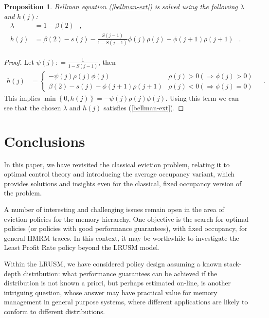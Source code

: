 \documentclass[11pt,a4paper]{article}
\DeclareMathOperator{\mf}{\enspace .}
\DeclareMathOperator{\mc}{\enspace ,}
\newcommand{\deq}{\mathrel{\mathop:}=}
\newtheorem{proposition}{Proposition}
\theoremstyle{definition}
\theoremstyle{remark}
\begin{document}
\begin{proposition}\label{m2bel}
  Bellman equation (\ref{bellman-ext}) is solved using the following $\lambda$
  and $h(j)$:
  \begin{equation}
    \begin{split}
      \lambda&=1-\beta(2) \mc\\
      h(j)&=\beta(2)-s(j)-\frac{S(j-1)}{1-S(j-1)}\phi(j)\rho(j)
      -\phi(j+1)\rho(j+1)\mf\\
                \end{split}\end{equation}
\end{proposition}
\begin{proof}  Let $\psi(j) \deq\frac{1}{1-S(j-1)}$, then
  \begin{equation}\begin{split}
      h(j)&=
      \begin{cases}
        -\psi(j)\rho(j)\phi(j)  & \rho(j)>0 \left(\Rightarrow
          \phi(j)>0\right)\\
        \beta(2)-s(j) - \phi(j+1)\rho(j+1) &\rho(j)<0
        \left(\Rightarrow \phi(j)=0\right)
      \end{cases}
    \end{split} \mf\end{equation}
  This implies $\min\left\{0, h(j)\right\}=-\psi(j)\rho(j)\phi(j)$.
    Using this term we can see that the chosen $\lambda$ and $h(j)$ satisfies
  (\ref{bellman-ext}).
\end{proof}


\section{Conclusions}
\label{sec:conclusions}

In this paper, we have revisited the classical eviction problem,
relating it to optimal control theory and introducing the average
occupancy variant, which provides solutions and insights even for the
classical, fixed occupancy version of the problem.

A number of interesting and challenging issues remain open in the area
of eviction policies for the memory hierarchy. One objective is the
search for optimal policies (or policies with good performance
guarantees), with fixed occupancy, for general HMRM traces. In this
context, it may be worthwhile to investigate the Least Profit Rate
policy beyond the LRUSM model.

Within the LRUSM, we have considered policy design assuming a known
stack-depth distribution: what performance guarantees can be achieved
if the distribution is not known a priori, but perhaps estimated
on-line, is another intriguing question, whose answer may have
practical value for memory management in general purpose systems,
where different applications are likely to conform to different
distributions.
\end{document}
